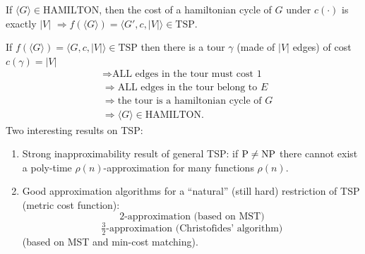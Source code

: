 If $\langle G\rangle\in\mathrm{HAMILTON}$, then the cost of a hamiltonian cycle of $G$ under $c(\cdot)$ is exactly $|V|$ $\Rightarrow f(\langle G\rangle)=\langle G',c,|V|\rangle\in\mathrm{TSP}$.

If $f(\langle G\rangle)=\langle G,c,|V|\rangle\in\mathrm{TSP}$ then there is a tour $\gamma$ (made of $|V|$ edges) of cost $c(\gamma)=|V|$
\begin{align*}
&\Rightarrow\text{ALL edges in the tour must cost 1}\\
&\Rightarrow\text{ALL edges in the tour belong to $E$}\\
&\Rightarrow\text{the tour is a hamiltonian cycle of $G$}\\
&\Rightarrow\langle G\rangle\in\mathrm{HAMILTON}.
\end{align*}
Two interesting results on TSP:
\begin{enumerate}
\item Strong inapproximability result of general TSP: if $\mathrm{P}\ne\mathrm{NP}$ there cannot exist a poly-time $\rho(n)$-approximation for many functions $\rho(n)$.
\item Good approximation algorithms for a ``natural'' (still hard) restriction of TSP (metric cost function):
\[2\text{-approximation (based on MST)}\]
\[\tfrac32\text{-approximation (Christofides' algorithm)}\]
(based on MST and min-cost matching).
\end{enumerate}
